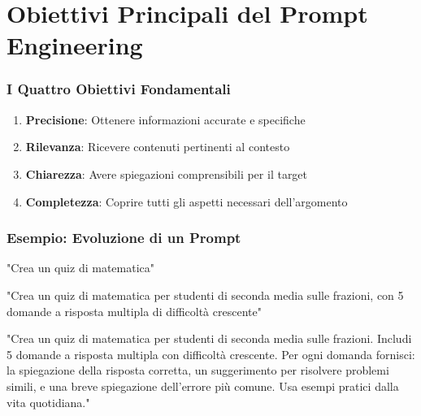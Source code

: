 \documentclass[aspectratio=169]{beamer}
\begin{document}
\section{Obiettivi Principali del Prompt Engineering}
%
%
\begin{frame}
\frametitle{I Quattro Obiettivi Fondamentali}
\begin{enumerate}[<+->]
\Large
    \item \textbf{Precisione}: Ottenere informazioni accurate e specifiche
    \item \textbf{Rilevanza}: Ricevere contenuti pertinenti al contesto
    \item \textbf{Chiarezza}: Avere spiegazioni comprensibili per il target
    \item \textbf{Completezza}: Coprire tutti gli aspetti necessari dell'argomento
\end{enumerate}
\end{frame}
%
%
\begin{frame}
\centering
\end{frame}
%
%
\begin{frame}
\frametitle{Esempio: Evoluzione di un Prompt}
\begin{examplebox}
"Crea un quiz di matematica"
\end{examplebox}

\pause
\begin{examplebox}
"Crea un quiz di matematica per studenti di seconda media sulle frazioni, con 5 domande a risposta multipla di difficoltà crescente"
\end{examplebox}

\pause
\begin{examplebox}
"Crea un quiz di matematica per studenti di seconda media sulle frazioni. Includi 5 domande a risposta multipla con difficoltà crescente. Per ogni domanda fornisci: la spiegazione della risposta corretta, un suggerimento per risolvere problemi simili, e una breve spiegazione dell'errore più comune. Usa esempi pratici dalla vita quotidiana."
\end{examplebox}
\end{frame}
%
\end{document}
